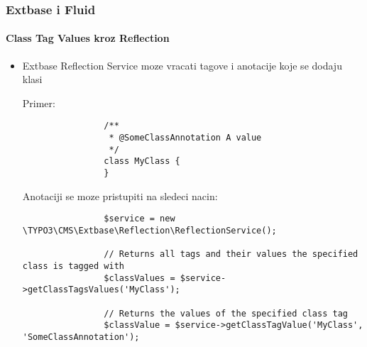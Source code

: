 \begin{frame}[fragile]
	\frametitle{Extbase i Fluid}
	\framesubtitle{Class Tag Values kroz Reflection}

	\lstset{
		basicstyle=\tiny\ttfamily
	}

	\begin{itemize}
		\item Extbase Reflection Service moze vracati tagove i anotacije koje se dodaju klasi\newline

			Primer:
			\begin{lstlisting}
				/**
				 * @SomeClassAnnotation A value
				 */
				class MyClass {
				}
			\end{lstlisting}

			Anotaciji se moze pristupiti na sledeci nacin:
			\begin{lstlisting}
				$service = new \TYPO3\CMS\Extbase\Reflection\ReflectionService();

				// Returns all tags and their values the specified class is tagged with
				$classValues = $service->getClassTagsValues('MyClass');

				// Returns the values of the specified class tag
				$classValue = $service->getClassTagValue('MyClass', 'SomeClassAnnotation');
			\end{lstlisting}

	\end{itemize}

\end{frame}

